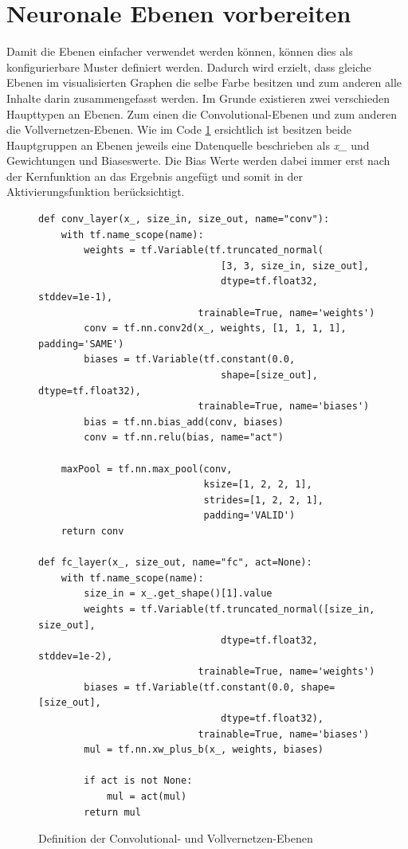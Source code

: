 \section{Neuronale Ebenen vorbereiten}

Damit die Ebenen einfacher verwendet werden können, können dies als konfigurierbare Muster definiert werden. 
Dadurch wird erzielt, dass gleiche Ebenen im visualisierten Graphen die selbe Farbe besitzen und zum anderen alle Inhalte darin zusammengefasst werden. 
Im Grunde existieren zwei verschieden Haupttypen an Ebenen. 
Zum einen die Convolutional-Ebenen und zum anderen die Vollvernetzen-Ebenen. 
Wie im Code \ref{fig:ConvFc} ersichtlich ist besitzen beide Hauptgruppen an Ebenen jeweils eine Datenquelle beschrieben als \textit{x\_} und Gewichtungen und Biaseswerte. 
Die Bias Werte werden dabei immer erst nach der Kernfunktion an das Ergebnis angefügt und somit in der Aktivierungsfunktion berücksichtigt. 
\begin{figure}[ht!]
\lstset{language=Python}
\begin{lstlisting}
def conv_layer(x_, size_in, size_out, name="conv"):
    with tf.name_scope(name):
        weights = tf.Variable(tf.truncated_normal(
        						[3, 3, size_in, size_out], 
        						dtype=tf.float32, stddev=1e-1), 
							trainable=True, name='weights')
        conv = tf.nn.conv2d(x_, weights, [1, 1, 1, 1], padding='SAME')
        biases = tf.Variable(tf.constant(0.0, 
								shape=[size_out], dtype=tf.float32), 
                            trainable=True, name='biases')
        bias = tf.nn.bias_add(conv, biases)
        conv = tf.nn.relu(bias, name="act")

    maxPool = tf.nn.max_pool(conv, 
                             ksize=[1, 2, 2, 1],
                             strides=[1, 2, 2, 1],
                             padding='VALID')
    return conv

def fc_layer(x_, size_out, name="fc", act=None):
    with tf.name_scope(name):
        size_in = x_.get_shape()[1].value
        weights = tf.Variable(tf.truncated_normal([size_in, size_out], 
								dtype=tf.float32, stddev=1e-2), 
							trainable=True, name='weights')
        biases = tf.Variable(tf.constant(0.0, shape=[size_out], 
								dtype=tf.float32), 
							trainable=True, name='biases')
        mul = tf.nn.xw_plus_b(x_, weights, biases)
        
        if act is not None:
            mul = act(mul)
        return mul
\end{lstlisting}
	\caption{Definition der Convolutional- und Vollvernetzen-Ebenen}
	\label{fig:ConvFc}
\end{figure}

